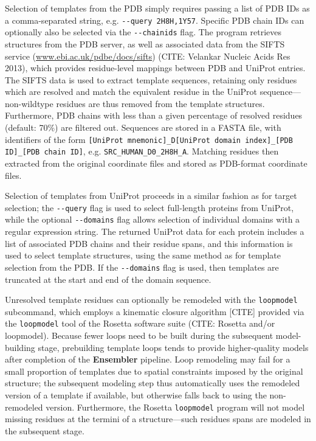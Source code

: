 \documentclass[aps,pre,twocolumn,nofootinbib,superscriptaddress,linenumbers]{revtex4-1}
\begin{document}
Selection of templates from the PDB simply requires passing a list of PDB IDs as a comma-separated string, e.g. {\tt -{}-query 2H8H,1Y57}.
Specific PDB chain IDs can optionally also be selected via the {\tt -{}-chainids} flag.
The program retrieves structures from the PDB server, as well as associated data from the SIFTS service (\href{http://www.ebi.ac.uk/pdbe/docs/sifts/}{www.ebi.ac.uk/pdbe/docs/sifts}) (CITE: Velankar Nucleic Acids Res 2013), which provides residue-level mappings between PDB and UniProt entries.
The SIFTS data is used to extract template sequences, retaining only residues which are resolved and match the equivalent residue in the UniProt sequence---non-wildtype residues are thus removed from the template structures.
Furthermore, PDB chains with less than a given percentage of resolved residues (default: 70\%) are filtered out.
Sequences are stored in a FASTA file, with identifiers of the form {\tt [UniProt mnemonic]\_D[UniProt domain index]\_[PDB ID]\_[PDB chain ID]}, e.g. {\tt SRC\_HUMAN\_D0\_2H8H\_A}.
Matching residues then extracted from the original coordinate files and stored as PDB-format coordinate files.

Selection of templates from UniProt proceeds in a similar fashion as for target selection; the {\tt -{}-query} flag is used to select full-length proteins from UniProt, while the optional {\tt -{}-domains} flag allows selection of individual domains with a regular expression string.
The returned UniProt data for each protein includes a list of associated PDB chains and their residue spans, and this information is used to select template structures, using the same method as for template selection from the PDB.
If the {\tt -{}-domains} flag is used, then templates are truncated at the start and end of the domain sequence.

Unresolved template residues can optionally be remodeled with the {\tt loopmodel} subcommand, which employs a kinematic closure algorithm {\color{red}[CITE]} provided via the {\tt loopmodel} tool of the Rosetta software suite (CITE: Rosetta and/or loopmodel).
Because fewer loops need to be built during the subsequent model-building stage, prebuilding template loops tends to provide higher-quality models after completion of the {\bf Ensembler} pipeline.
Loop remodeling may fail for a small proportion of templates due to spatial constraints imposed by the original structure; the subsequent modeling step thus automatically uses the remodeled version of a template if available, but otherwise falls back to using the non-remodeled version.
Furthermore, the Rosetta {\tt loopmodel} program will not model missing residues at the termini of a structure---such residues spans are modeled in the subsequent stage.
\end{document}
